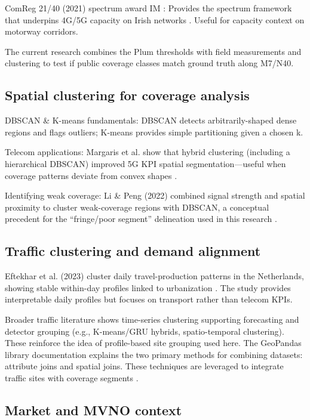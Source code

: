 \documentclass[MScCS]{uccthesis}
\begin{document}
ComReg 21/40 (2021) spectrum award IM : Provides the spectrum framework that underpins 4G/5G capacity on Irish networks \cite{comreg2140_IM}. Useful for capacity context on motorway corridors.

The current research combines the Plum thresholds with field measurements and clustering to test if public coverage classes match ground truth along M7/N40.



\subsection{Spatial clustering for coverage analysis}

DBSCAN \& K-means fundamentals: DBSCAN \cite{ester1996} detects arbitrarily-shaped dense regions and flags outliers; K-means \cite{macqueen1967} provides simple partitioning given a chosen k. 

Telecom applications: Margaris et al. show that hybrid clustering (including a hierarchical DBSCAN) improved 5G KPI spatial segmentation---useful when coverage patterns deviate from convex shapes \cite{margaris2022hybrid}.

Identifying weak coverage: Li \& Peng (2022) combined signal strength and spatial proximity to cluster weak-coverage regions with DBSCAN, a conceptual precedent for the ``fringe/poor segment'' delineation used in this research \cite{Li2022}.


\subsection{Traffic clustering and demand alignment}

Eftekhar et al. (2023) cluster daily travel-production patterns in the Netherlands, showing stable within-day profiles linked to urbanization \cite{Eftekhar2023}. The study provides interpretable daily profiles but focuses on transport rather than telecom KPIs.

Broader traffic literature shows time-series clustering supporting forecasting and detector grouping (e.g., K-means/GRU hybrids, spatio-temporal clustering). These reinforce the idea of profile-based site grouping used here. The GeoPandas library documentation explains the two primary methods for combining datasets: attribute joins and spatial joins. These techniques are leveraged to integrate traffic sites with coverage segments \cite{jordahl2020geopandas}.


\subsection{Market and MVNO context}
\end{document}
